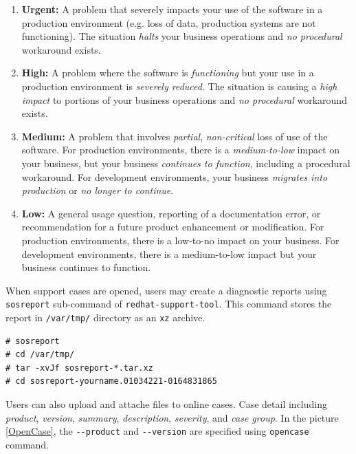 \begin{enumerate}
\item \textbf{Urgent:} A problem that severely impacts your use of the software in a production environment (e.g. loss of data, production systems are not functioning). The situation \emph{halts} your business operations and \emph{no procedural} workaround exists.

\item \textbf{High:} A problem where the software is \emph{functioning} but your use in a production environment is \emph{severely reduced}. The situation is causing a \emph{high impact} to portions of your business operations and \emph{no procedural} workaround exists.

\item \textbf{Medium:} A problem that involves \emph{partial}, \emph{non-critical} loss of use of the software. For production environments, there is a \emph{medium-to-low} impact on your business, but your business \emph{continues to function}, including a procedural workaround. For development environments, your business \emph{migrates into production} or \emph{no longer to continue}.

\item \textbf{Low:} A general usage question, reporting of a documentation error, or recommendation for a future product enhancement or modification. For production environments, there is a low-to-no impact on your business. For development environments, there is a medium-to-low impact but your business continues to function.
\end{enumerate}

When support cases are opened, users may create a diagnostic reports using \verb|sosreport| sub-command of \verb|redhat-support-tool|. This command stores the report in \verb|/var/tmp/| directory as an \verb|xz| archive. 

\begin{verbatim}
# sosreport
# cd /var/tmp/
# tar -xvJf sosreport-*.tar.xz
# cd sosreport-yourname.01034221-0164831865
\end{verbatim}

Users can also upload and attache files to online cases. Case detail including \emph{product}, \emph{version}, \emph{summary}, \emph{description}, \emph{severity}, and \emph{case group}. In the picture \ref{OpenCase}, the \verb|--product| and \verb|--version| are specified using \verb|opencase| command.\\

